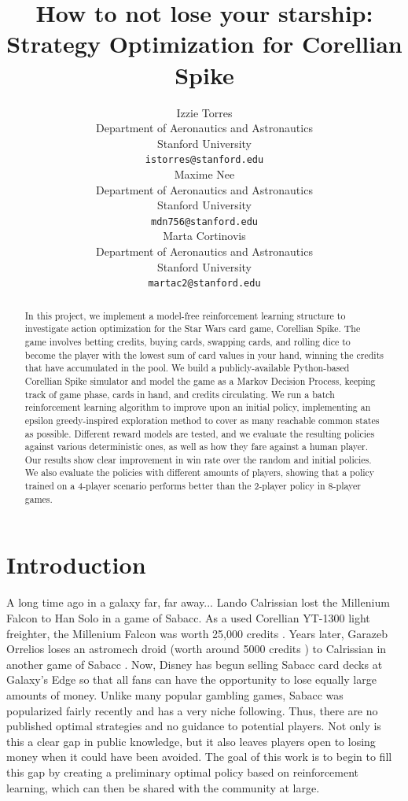 \documentclass{article}
\title{How to not lose your starship: Strategy Optimization for Corellian Spike}
\author{ Izzie Torres\\
	Department of Aeronautics and Astronautics\\
	Stanford University\\
	\texttt{istorres@stanford.edu} \\
	\And
	{Maxime Nee} \\
	Department of Aeronautics and Astronautics\\
	Stanford University\\
	\texttt{mdn756@stanford.edu} \\
 	\And
	{Marta Cortinovis} \\
	Department of Aeronautics and Astronautics\\
	Stanford University\\
	\texttt{martac2@stanford.edu} \\
}
\date{}
\begin{document}
\maketitle

\begin{abstract}
In this project, we implement a model-free reinforcement learning structure to investigate action optimization for the Star Wars card game, Corellian Spike. The game involves betting credits, buying cards, swapping cards, and rolling dice to become the player with the lowest sum of card values in your hand, winning the credits that have accumulated in the pool. We build a publicly-available Python-based Corellian Spike simulator and model the game as a Markov Decision Process, keeping track of game phase, cards in hand, and credits circulating. We run a batch reinforcement learning algorithm to improve upon an initial policy, implementing an epsilon greedy-inspired exploration method to cover as many reachable common states as possible. Different reward models are tested, and we evaluate the resulting policies against various deterministic ones, as well as how they fare against a human player. Our results show clear improvement in win rate over the random and initial policies. We also evaluate the policies with different amounts of players, showing that a policy trained on a 4-player scenario performs better than the 2-player policy in 8-player games.

\end{abstract}

\section{Introduction} %
A long time ago in a galaxy far, far away... Lando Calrissian lost the Millenium Falcon to Han Solo in a game of Sabacc. As a used Corellian YT-1300 light freighter, the Millenium Falcon was worth 25,000 credits \cite{starship}.  Years later, Garazeb Orrelios loses an astromech droid (worth around 5000 credits \cite{astromech}) to Calrissian in another game of Sabacc \cite{rebels}. Now, Disney has begun selling Sabacc card decks at Galaxy's Edge so that all fans can have the opportunity to lose equally large amounts of money. Unlike many popular gambling games, Sabacc was popularized fairly recently and has a very niche following. Thus, there are no published optimal strategies and no guidance to potential players. Not only is this a clear gap in public knowledge, but it also leaves players open to losing money when it could have been avoided. The goal of this work is to begin to fill this gap by creating a preliminary optimal policy based on reinforcement learning, which can then be shared with the community at large.
\end{document}
